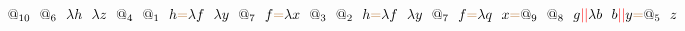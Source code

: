 \documentclass[a4paper, 10pt]{article}
\newcommand{\tikzmark}[3][]{\tikz[remember picture,baseline] \node [inner xsep=0pt,anchor=base,#1](#2) {#3};}
\begin{document}
\[\tikzmark{1}{$@_{10}$}\ \ \tikzmark{2}{$@_6$}\ \ \tikzmark{3}{$\lambda h$}\ \ \tikzmark{4}{$\lambda z$}\ \ \tikzmark{5}{$@_4$}\ \ \tikzmark{6}{$@_1$}\ \ \tikzmark{7}{$h$}\tikzmark{}{\color{brown}{=}}\tikzmark{8}{$\lambda f$}\ \ \tikzmark{9}{$\lambda y$}\ \ \tikzmark{10}{$@_7$}\ \ \tikzmark{11}{$f$}\tikzmark{}{\color{brown}{=}}\tikzmark{12}{$\lambda x$}\ \ \tikzmark{13}{$@_3$}\ \ \tikzmark{14}{$@_2$}\ \ \tikzmark{15}{$h$}\tikzmark{}{\color{brown}{=}}\tikzmark{16}{$\lambda f$}\ \ \tikzmark{17}{$\lambda y$}\ \ \tikzmark{18}{$@_7$}\ \ \tikzmark{19}{$f$}\tikzmark{}{\color{brown}{=}}\tikzmark{20}{$\lambda q$}\ \ \tikzmark{21}{$x$}\tikzmark{}{\color{brown}{=}}\tikzmark{22}{$@_9$}\ \ \tikzmark{23}{$@_8$}\ \ \tikzmark{24}{$g$}\tikzmark{}{\color{red}{||}}\tikzmark{25}{$\lambda b$}\ \ \tikzmark{26}{$b$}\tikzmark{}{\color{red}{||}}\tikzmark{27}{$y$}\tikzmark{}{\color{brown}{=}}\tikzmark{29}{$@_5$}\ \ \tikzmark{30}{$z$}\]
\end{document}
